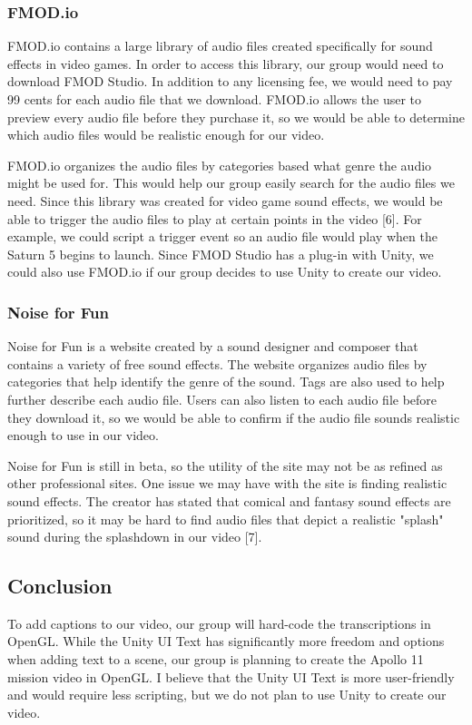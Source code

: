 \documentclass[onecolumn, draftclsnofoot,10pt, compsoc]{IEEEtran}
\begin{document}
\subsubsection{FMOD.io}
FMOD.io contains a large library of audio files created specifically for sound effects in video games. In order to access this library, our group would need to download FMOD Studio. In addition to any licensing fee, we would need to pay 99 cents for each audio file that we download. FMOD.io allows the user to preview every audio file before they purchase it, so we would be able to determine which audio files would be realistic enough for our video.

FMOD.io organizes the audio files by categories based what genre the audio might be used for. This would help our group easily search for the audio files we need. Since this library was created for video game sound effects, we would be able to trigger the audio files to play at certain points in the video [6]. For example, we could script a trigger event so an audio file would play when the Saturn 5 begins to launch. Since FMOD Studio has a plug-in with Unity, we could also use FMOD.io if our group decides to use Unity to create our video.

\subsubsection{Noise for Fun}
Noise for Fun is a website created by a sound designer and composer that contains a variety of free sound effects. The website organizes audio files by categories that help identify the genre of the sound. Tags are also used to help further describe each audio file. Users can also listen to each audio file before they download it, so we would be able to confirm if the audio file sounds realistic enough to use in our video.

Noise for Fun is still in beta, so the utility of the site may not be as refined as other professional sites. One issue we may have with the site is finding realistic sound effects. The creator has stated that comical and fantasy sound effects are prioritized, so it may be hard to find audio files that depict a realistic "splash" sound during the splashdown in our video [7].

\subsection{Conclusion}
To add captions to our video, our group will hard-code the transcriptions in OpenGL. While the Unity UI Text has significantly more freedom and options when adding text to a scene, our group is planning to create the Apollo 11 mission video in OpenGL. I believe that the Unity UI Text is more user-friendly and would require less scripting, but we do not plan to use Unity to create our video.
\end{document}
